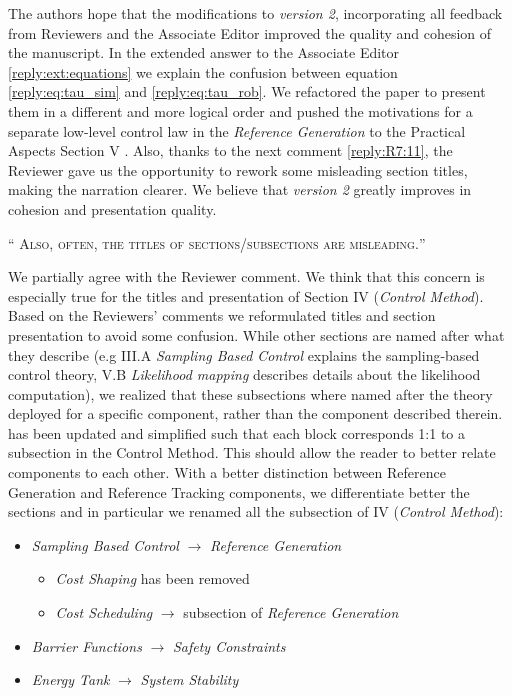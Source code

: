 \documentclass[10pt]{article}
\newcommand{\referee}[1]{\;
  \begin{minipage}[t]{.95\textwidth}
    ``{\small\color{red} \textsc{#1}}''
  \end{minipage}\medskip
  }
\newcommand{\version}[1]{\textit{version #1}}
\begin{document}
\begin{enumerate}[label={[R7:\,\arabic{enumi}]}]
The authors hope that the modifications to \version{2}, incorporating all feedback from Reviewers and the Associate Editor improved the quality and cohesion of the manuscript. In the extended answer to the Associate Editor \ref{reply:ext:equations} we explain the confusion between equation \eqref{reply:eq:tau_sim} and \eqref{reply:eq:tau_rob}. We refactored the paper to present them in a different and more logical order and pushed the motivations for a separate low-level control law in the \emph{Reference Generation} to the Practical Aspects Section V . Also, thanks to the next comment \ref{reply:R7:11}, the Reviewer gave us the opportunity to rework some misleading section titles, making the narration clearer. We believe that \version{2} greatly improves in cohesion and presentation quality.


\item\label{reply:R7:11} 
\referee{Also, often, the titles of sections/subsections are misleading.}

We partially agree with the Reviewer comment. We think that this concern is especially true for the titles and presentation of Section IV (\emph{Control Method}). Based on the Reviewers' comments we reformulated titles and section presentation to avoid some confusion. While other sections are named after what they describe (e.g III.A \textit{Sampling Based Control} explains the sampling-based control theory, V.B \textit{Likelihood mapping} describes details about the likelihood computation), we realized that these subsections where named after the theory deployed for a specific component, rather than the component described therein.  has been updated and simplified such that each block corresponds 1:1 to a subsection in the Control Method. This should allow the reader to better relate components to each other. With a better distinction between Reference Generation and Reference Tracking components, we differentiate better the sections and in particular we renamed all the subsection of \sect IV (\emph{Control Method}):
\begin{itemize}
    \item \emph{Sampling Based Control} $\to$ \emph{Reference Generation} 
    \begin{itemize}
        \item \emph{Cost Shaping} has been removed
        \item \emph{Cost Scheduling} $\to$ subsection of \emph{Reference Generation}
    \end{itemize}
    \item \emph{Barrier Functions} $\to$ \emph{Safety Constraints}
    \item \emph{Energy Tank} $\to$ \emph{System Stability}
\end{itemize}



\end{enumerate}
\end{document}
